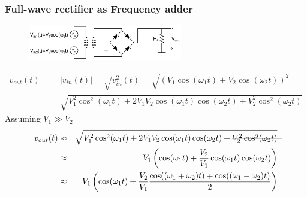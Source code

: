 \documentclass[beamer]{standalone}
\begin{document}
\begin{frame}
 \frametitle{ Full-wave rectifier as Frequency adder}
  \begin{figure}
    \includegraphics[width=0.60\textwidth]{./schematics/full_wave_rectifier_as_adder}
  \end{figure}
      \begin{eqnarray*}
        v_{out}(t) 
        & = & |v_{in}(t)| = \sqrt{v_{in}^2(t)} = \sqrt{ \left( V_1 \cos(\omega_1 t) + V_2 \cos(\omega_2 t) \right)^2  } \\
        &=& \sqrt{  
        V_1^2 \cos^2(\omega_1 t) 
        + 2 V_1 V_2 \cos(\omega_1 t) \cos(\omega_2 t) 
        + V_2^2 \cos^2(\omega_2 t) 
        }
      \end{eqnarray*}
      Assuming $V_1 \gg V_2$
      \begin{eqnarray*}
        v_{out}(t) 
        &\approx&  
        \sqrt{ V_1^2 \cos^2(\omega_1 t) + 2 V_1 V_2
        \cos(\omega_1 t) \cos(\omega_2 t) 
        +\rlap{------------------}{ V_2^2 \cos^2(\omega_2 t) }
        } \\
        &\approx&  
        V_1 \left( \cos(\omega_1 t) + \frac{V_2}{V_1} \cos(\omega_1 t)
        \cos(\omega_2 t) \right) \\
        &\approx&  
        V_1 \left( 
          \cos(\omega_1 t) 
          + \frac{V_2}{V_1} 
            \frac{
              \cos( (\omega_1 +\omega_2) t) + \cos( (\omega_1 -\omega_2) t)  
              }{2}
        \right)
      \end{eqnarray*}
\end{frame}
  
\end{document}
